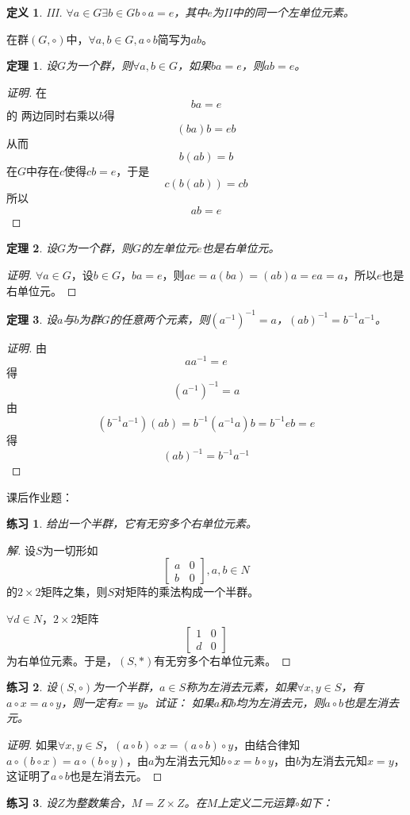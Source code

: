 \documentclass{article}
\newtheorem{Def}{定义}
\newtheorem{Thm}{定理}
\newtheorem{Exercise}{练习}
\begin{document}
\begin{CJK*}{UTF8}{gbsn}
\begin{Def}
    III. $\forall a\in G \exists b\in G b\circ a = e$，其中$e$为II中的同一个左单位元素。
  \end{Def}
  在群$(G,\circ)$中，$\forall a,b\in G, a\circ b$简写为$ab$。
  \begin{Thm}
    设$G$为一个群，则$\forall a,b\in G$，如果$ba=e$，则$ab=e$。
  \end{Thm}
  \begin{proof}[证明]
    在\[ba=e\]的
    两边同时右乘以$b$得
    \[(ba)b=eb\]
    从而
    \[b(ab)=b\]
    在$G$中存在$c$使得$cb=e$，于是
    \[c(b(ab))=cb\]
    所以
    \[ab=e\]
  \end{proof}
  \begin{Thm}
    设$G$为一个群，则$G$的左单位元$e$也是右单位元。
  \end{Thm}
  \begin{proof}[证明]
    $\forall a\in G$，设$b\in G$，$ba=e$，则$ae=a(ba)=(ab)a=ea=a$，所以$e$也是右单位元。
  \end{proof}
  \begin{Thm}
    设$a$与$b$为群$G$的任意两个元素，则$(a^{-1})^{-1}=a$，$(ab)^{-1}=b^{-1}a^{-1}$。
  \end{Thm}
  \begin{proof}[证明]
    由\[aa^{-1}=e\]
    得\[(a^{-1})^{-1}=a\]
  由\[(b^{-1}a^{-1})(ab)=b^{-1}(a^{-1}a)b=b^{-1}eb=e\]
  得\[(ab)^{-1}=b^{-1}a^{-1}\]
  \end{proof}
    




  课后作业题：

\begin{Exercise}
  给出一个半群，它有无穷多个右单位元素。
\end{Exercise}
\begin{proof}[解]
  设$S$为一切形如
  \[\begin{bmatrix}
    a&0\\
    b&0
  \end{bmatrix},a,b\in N\]
的$2\times 2$矩阵之集，则$S$对矩阵的乘法构成一个半群。

$\forall d\in N$，$2\times 2$矩阵
\[\begin{bmatrix}1&0\\d&0\end{bmatrix}\]
为右单位元素。于是，$(S,*)$有无穷多个右单位元素。  
\end{proof}
\begin{Exercise}
  设$(S,\circ)$为一个半群，$a\in S$称为左消去元素，如果$\forall x, y\in S$，有$a\circ x=a\circ y$，则一定有$x=y$。试证：
  如果$a$和$b$均为左消去元，则$a\circ b$也是左消去元。
\end{Exercise}
\begin{proof}[证明]
  如果$\forall x, y\in S$，$(a\circ b)\circ x=(a\circ b)\circ y$，由结合律知$a\circ (b\circ x)=a\circ (b\circ y)$，由$a$为左消去元知$b\circ x=b\circ y$，由$b$为左消去元知$x=y$，这证明了$a\circ b$也是左消去元。
\end{proof}
\begin{Exercise}
  设$Z$为整数集合，$M=Z\times Z$。在$M$上定义二元运算$\circ$如下：


\end{Exercise}
\end{CJK*}
\end{document}
